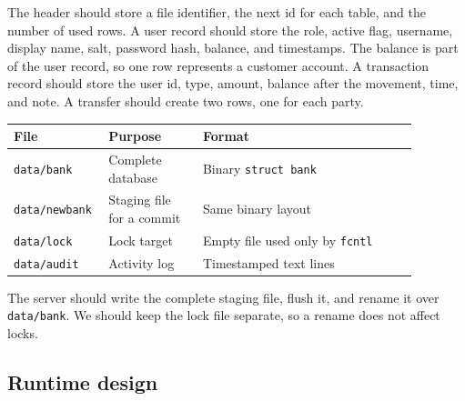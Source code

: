 \documentclass[11pt,a4paper]{article}
\begin{document}
The header should store a file identifier, the next id for each table, and the number of used rows. A user record should store the role, active flag, username, display name, salt, password hash, balance, and timestamps. The balance is part of the user record, so one row represents a customer account. A transaction record should store the user id, type, amount, balance after the movement, time, and note. A transfer should create two rows, one for each party.

\begin{longtable}{L{0.16\linewidth}L{0.22\linewidth}L{0.50\linewidth}}
\hline
File & Purpose & Format \\
\hline
\texttt{data/bank} & Complete database & Binary \texttt{struct bank} \\
\texttt{data/newbank} & Staging file for a commit & Same binary layout \\
\texttt{data/lock} & Lock target & Empty file used only by \texttt{fcntl} \\
\texttt{data/audit} & Activity log & Timestamped text lines \\
\hline
\end{longtable}

The server should write the complete staging file, flush it, and rename it over \texttt{data/bank}. We should keep the lock file separate, so a rename does not affect locks.

\subsection{Runtime design}
\end{document}
